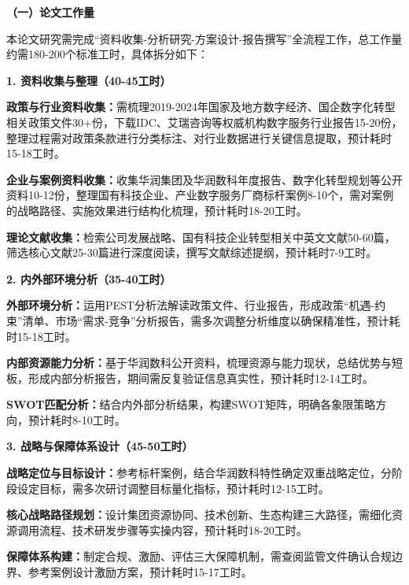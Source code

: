 \documentclass[UTF8, a4paper, 11pt]{ctexart}
\begin{document}
\begin{UnifiedBox}[height=25.4cm]
\setlength{\parindent}{2em}

\noindent \textbf{（一）论文工作量}

本论文研究需完成``资料收集-分析研究-方案设计-报告撰写''全流程工作，总工作量约需180-200个标准工时，具体拆分如下：

\vspace{0.2cm}
\noindent \textbf{1. 资料收集与整理（40-45工时）}

\noindent \textbf{政策与行业资料收集：}需梳理2019-2024年国家及地方数字经济、国企数字化转型相关政策文件30+份，下载IDC、艾瑞咨询等权威机构数字服务行业报告15-20份，整理过程需对政策条款进行分类标注、对行业数据进行关键信息提取，预计耗时15-18工时。

\noindent \textbf{企业与案例资料收集：}收集华润集团及华润数科年度报告、数字化转型规划等公开资料10-12份，整理国有科技企业、产业数字服务厂商标杆案例8-10个，需对案例的战略路径、实施效果进行结构化梳理，预计耗时18-20工时。

\noindent \textbf{理论文献收集：}检索公司发展战略、国有科技企业转型相关中英文文献50-60篇，筛选核心文献25-30篇进行深度阅读，撰写文献综述提纲，预计耗时7-9工时。

\vspace{0.2cm}
\noindent \textbf{2. 内外部环境分析（35-40工时）}

\noindent \textbf{外部环境分析：}运用PEST分析法解读政策文件、行业报告，形成政策``机遇-约束''清单、市场``需求-竞争''分析报告，需多次调整分析维度以确保精准性，预计耗时15-18工时。

\noindent \textbf{内部资源能力分析：}基于华润数科公开资料，梳理资源与能力现状，总结优势与短板，形成内部分析报告，期间需反复验证信息真实性，预计耗时12-14工时。

\noindent \textbf{SWOT匹配分析：}结合内外部分析结果，构建SWOT矩阵，明确各象限策略方向，预计耗时8-10工时。

\vspace{0.2cm}
\noindent \textbf{3. 战略与保障体系设计（45-50工时）}

\noindent \textbf{战略定位与目标设计：}参考标杆案例，结合华润数科特性确定双重战略定位，分阶段设定目标，需多次研讨调整目标量化指标，预计耗时12-15工时。

\noindent \textbf{核心战略路径规划：}设计集团资源协同、技术创新、生态构建三大路径，需细化资源调用流程、技术研发步骤等实操内容，预计耗时18-20工时。

\noindent \textbf{保障体系构建：}制定合规、激励、评估三大保障机制，需查阅监管文件确认合规边界、参考案例设计激励方案，预计耗时15-17工时。


\end{UnifiedBox}
\end{document}
